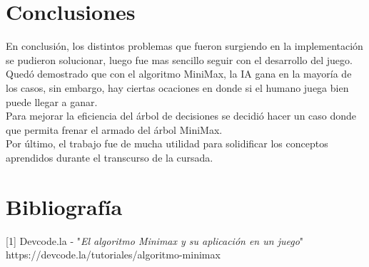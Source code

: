 \documentclass[12pt,a4paper]{article}
\begin{document}
\section{Conclusiones}
En conclusión, los distintos problemas que fueron surgiendo en la implementación se pudieron solucionar, luego fue mas sencillo seguir con el desarrollo del juego.\\

Quedó demostrado que con el algoritmo MiniMax, la IA gana en la mayoría de los casos, sin embargo, hay ciertas ocaciones en donde si el humano juega bien puede llegar a ganar.\\

Para mejorar la eficiencia del árbol de decisiones se decidió hacer un caso donde que permita frenar el armado del árbol MiniMax.\\

Por último, el trabajo fue de mucha utilidad para solidificar los conceptos aprendidos durante el transcurso de la cursada.
\newpage
\section{Bibliografía}
[1] Devcode.la - "\emph{El algoritmo Minimax y su aplicación en un juego}"\\
https://devcode.la/tutoriales/algoritmo-minimax
\end{document}
